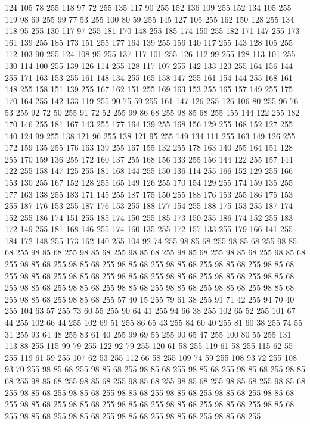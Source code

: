 124 105 78 255 118 97 72 255 135 117 90 255 152 136 109 255 152 134 105 255 119 98 69 255 99 77 53 255 100 80 59 255 145 127 105 255 162 150 128 255 134 118 95 255 130 117 97 255 181 170 148 255 185 174 150 255 182 171 147 255 173 161 139 255 185 173 151 255 177 164 139 255 156 140 117 255 143 128 105 255 112 103 90 255 124 108 95 255 137 117 101 255 126 112 99 255 128 113 101 255 130 114 100 255 139 126 114 255 128 117 107 255 142 133 123 255 164 156 144 255 171 163 153 255 161 148 134 255 165 158 147 255 161 154 144 255 168 161 148 255 158 151 139 255 167 162 151 255 169 163 153 255 165 157 149 255 175 170 164 255 142 133 119 255 90 75 59 255 161 147 126 255 126 106 80 255 96 76 53 255 92 72 50 255 91 72 52 255 99 86 68 255 98 85 68 255 155 144 122 255 182 170 146 255 181 167 143 255 177 164 139 255 168 156 129 255 168 152 127 255 140 124 99 255 138 121 96 255 138 121 95 255 149 134 111 255 163 149 126 255 172 159 135 255 176 163 139 255 167 155 132 255 178 163 140 255
164 151 128 255 170 159 136 255 172 160 137 255 168 156 133 255 156 144 122 255 157 144 122 255 158 147 125 255 181 168 144 255 150 136 114 255 166 152 129 255 166 153 130 255 167 152 128 255 165 149 126 255 170 154 129 255 174 159 135 255 177 163 138 255 183 171 145 255 187 175 150 255 188 176 153 255 186 175 153 255 187 176 153 255 187 176 153 255 188 177 154 255 188 175 153 255 187 174 152 255 186 174 151 255 185 174 150 255 185 173 150 255 186 174 152 255 183 172 149 255 181 168 146 255 174 160 135 255 172 157 133 255 179 166 141 255 184 172 148 255 173 162 140 255 104 92 74 255 98 85 68 255 98 85 68 255 98 85 68 255 98 85 68 255 98 85 68 255 98 85 68 255 98 85 68 255 98 85 68 255 98 85 68 255 98 85 68 255 98 85 68 255 98 85 68 255 98 85 68 255 98 85 68 255 98 85 68 255 98 85 68 255 98 85 68 255 98 85 68 255 98 85 68 255 98 85 68 255 98 85 68 255 98 85 68 255 98 85 68 255 98 85 68 255 98 85 68 255 98 85 68 255 98 85 68 255
98 85 68 255 98 85 68 255 57 40 15 255 79 61 38 255 91 71 42 255 94 70 40 255 104 63 57 255 73 60 55 255 90 64 41 255 94 66 38 255 102 65 52 255 101 67 44 255 102 66 44 255 102 69 51 255 86 65 43 255 84 60 40 255 81 60 38 255 74 55 31 255 93 64 48 255 83 61 40 255 99 69 55 255 90 65 47 255 100 80 55 255 131 113 88 255 115 99 79 255 122 92 79 255 120 61 58 255 119 61 58 255 115 62 55 255 119 61 59 255 107 62 53 255 112 66 58 255 109 74 59 255 108 93 72 255 108 93 70 255 98 85 68 255 98 85 68 255 98 85 68 255 98 85 68 255 98 85 68 255 98 85 68 255 98 85 68 255 98 85 68 255 98 85 68 255 98 85 68 255 98 85 68 255 98 85 68 255 98 85 68 255 98 85 68 255 98 85 68 255 98 85 68 255 98 85 68 255 98 85 68 255 98 85 68 255 98 85 68 255 98 85 68 255 98 85 68 255 98 85 68 255 98 85 68 255 98 85 68 255 98 85 68 255 98 85 68 255 98 85 68 255 98 85 68 255
